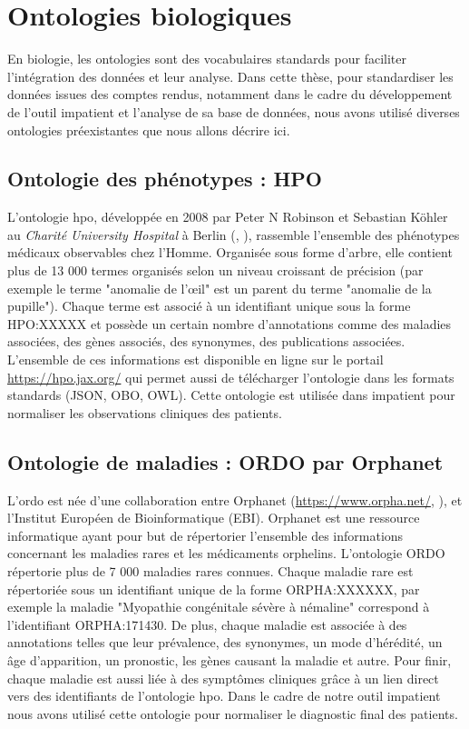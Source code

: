 \section{Ontologies biologiques}
En biologie, les ontologies sont des vocabulaires standards pour faciliter l'intégration des données et leur analyse. Dans cette thèse, pour standardiser les données issues des comptes rendus, notamment dans le cadre du développement de l'outil \gls{impatient} et l'analyse de sa base de données, nous avons utilisé diverses ontologies préexistantes que nous allons décrire ici.

\subsection{Ontologie des phénotypes : HPO}
L'ontologie \gls{hpo}, développée en 2008 par Peter N Robinson et Sebastian Köhler au \textit{Charité University Hospital} à Berlin (\cite{robinson_human_2008}, \cite{kohler_human_2021}), rassemble l'ensemble des phénotypes médicaux observables chez l'Homme. Organisée sous forme d'arbre, elle contient plus de 13 000 termes organisés selon un niveau croissant de précision (par exemple le terme "anomalie de l'œil" est un parent du terme "anomalie de la pupille"). Chaque terme est associé à un identifiant unique sous la forme HPO:XXXXX et possède un certain nombre d’annotations comme des maladies associées, des gènes associés, des synonymes, des publications associées. L'ensemble de ces informations est disponible en ligne sur le portail  \href{https://hpo.jax.org/}{https://hpo.jax.org/} qui permet aussi de télécharger l'ontologie dans les formats standards (JSON, OBO, OWL). Cette ontologie est utilisée dans \gls{impatient} pour normaliser les observations cliniques des patients.

\subsection{Ontologie de maladies : ORDO par Orphanet}
L'\gls{ordo} est née d'une collaboration entre Orphanet (\href{https://www.orpha.net/}{https://www.orpha.net/}, \cite{maiella_orphanet_2013}), et l'Institut Européen de Bioinformatique (EBI). Orphanet est une ressource informatique ayant pour but de répertorier l'ensemble des informations concernant les maladies rares et les médicaments orphelins. L'ontologie ORDO répertorie plus de 7 000 maladies rares connues. Chaque maladie rare est répertoriée sous un identifiant unique de la forme ORPHA:XXXXXX, par exemple la maladie "Myopathie congénitale sévère à némaline" correspond à l'identifiant ORPHA:171430. De plus, chaque maladie est associée à des annotations telles que leur prévalence, des synonymes, un mode d'hérédité, un âge d'apparition, un pronostic, les gènes causant la maladie et autre. Pour finir, chaque maladie est aussi liée à des symptômes cliniques grâce à un lien direct vers des identifiants de l'ontologie \gls{hpo}. Dans le cadre de notre outil \gls{impatient} nous avons utilisé cette ontologie pour normaliser le diagnostic final des patients.


